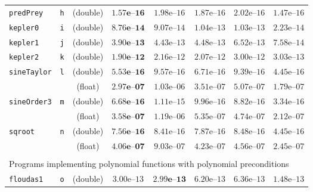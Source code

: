 \begin{tabular}{p{2.3cm}ccccccc}
\multirow{1}{*}{\texttt{predPrey}} & \texttt{h}
& (double) & $\mathbf{1.57\textbf{e--}16}$ & $1.98\text{e--}16$ & $1.87\text{e--}16$ & $2.02\text{e--}16$ & $1.47\text{e--}16$ \\
\multirow{1}{*}{\texttt{kepler0}} & \texttt{i}
& (double) & $\mathbf{8.76\textbf{e--}14}$ & $9.07\text{e--}14$ & $1.04\text{e--}13$ & $1.03\text{e--}13$ & $2.23\text{e--}14$\\
\multirow{1}{*}{\texttt{kepler1}} & \texttt{j}
& (double) & $\mathbf{3.90\textbf{e--}13}$ & $4.43\text{e--}13$ & $4.48\text{e--}13$ & $6.52\text{e--}13$ & $7.58\text{e--}14$\\
\multirow{1}{*}{\texttt{kepler2}} & \texttt{k}
& (double) & $\mathbf{1.90\textbf{e--}12}$ & $2.16\text{e--}12$ & $2.07\text{e--}12$ & $3.00\text{e--}12$ & $3.03\text{e--}13$\\
\hline
\multirow{2}{*}{\texttt{sineTaylor}} & \multirow{2}{*}{\texttt{l}}
& (double) & $\mathbf{5.53\textbf{e--}16}$ & $9.57\text{e--}16$ & $6.71\text{e--}16$ & $9.39\text{e--}16$ & $4.45\text{e--}16$\\
& & (float) & $\mathbf{2.97\textbf{e--}07}$ & $1.03\text{e--}06$ & $3.51\text{e--}07$ & $5.07\text{e--}07$ & $1.79\text{e--}07$\\
\hline 
\multirow{2}{*}{\texttt{sineOrder3}} & \multirow{2}{*}{\texttt{m}}
& (double) & $\mathbf{6.68\textbf{e--}16}$ & $1.11\text{e--}15$ & $9.96\text{e--}16$ & $8.82\text{e--}16$ & $3.34\text{e--}16$\\
& & (float) & $\mathbf{3.58\textbf{e--}07}$ & $1.19\text{e--}06$ & $5.35\text{e--}07$ & $4.74\text{e--}07$ & $2.12\text{e--}07$\\
\hline
\multirow{2}{*}{\texttt{sqroot}} & \multirow{2}{*}{\texttt{n}}
& (double) & $\mathbf{7.56\textbf{e--}16}$ & $8.41\text{e--}16$ & $7.87\text{e--}16$ & $8.48\text{e--}16$ & $4.45\text{e--}16$\\
& & (float) & $\mathbf{4.06\textbf{e--}07}$ & $9.03\text{e--}07$ & $4.23\text{e--}07$ & $4.56\text{e--}07$ & $2.45\text{e--}07$\\
\hline
\\
\multicolumn{8}{l}{Programs implementing polynomial functions with polynomial preconditions}\\
\hline
\multirow{1}{*}{\texttt{floudas1}} & \texttt{o}
& (double) & $3.00\text{e--}13$ & $\mathbf{2.99\textbf{e--}13}$ & $6.20\text{e--}13$ & $6.36\text{e--}13$ & $1.48\text{e--}13$ \\

\end{tabular}
